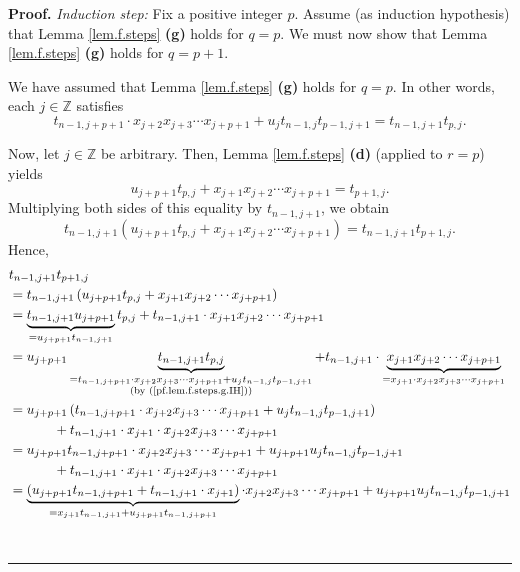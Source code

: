 \documentclass[numbers=enddot,12pt,final,onecolumn,notitlepage]{scrartcl}%
\theoremstyle{definition}
\newenvironment{proof}[1][Proof]{\noindent\textbf{#1.} }{\ \rule{0.5em}{0.5em}}
\newenvironment{vershort}{}{}
\begin{document}
\begin{proof}
\textit{Induction step:} Fix a positive integer $p$. Assume (as induction
hypothesis) that Lemma \ref{lem.f.steps} \textbf{(g)} holds for $q=p$. We must
now show that Lemma \ref{lem.f.steps} \textbf{(g)} holds for $q=p+1$.

We have assumed that Lemma \ref{lem.f.steps} \textbf{(g)} holds for $q=p$. In
other words, each $j\in\mathbb{Z}$ satisfies%
\begin{equation}
t_{n-1,j+p+1}\cdot x_{j+2}x_{j+3}\cdots x_{j+p+1}+u_{j}t_{n-1,j}%
t_{p-1,j+1}=t_{n-1,j+1}t_{p,j}. \label{pf.lem.f.steps.g.IH}%
\end{equation}


\begin{vershort}
Now, let $j\in\mathbb{Z}$ be arbitrary. Then, Lemma \ref{lem.f.steps}
\textbf{(d)} (applied to $r=p$) yields%
\[
u_{j+p+1}t_{p,j}+x_{j+1}x_{j+2}\cdots x_{j+p+1}=t_{p+1,j}.
\]
Multiplying both sides of this equality by $t_{n-1,j+1}$, we obtain%
\[
t_{n-1,j+1}\left(  u_{j+p+1}t_{p,j}+x_{j+1}x_{j+2}\cdots x_{j+p+1}\right)
=t_{n-1,j+1}t_{p+1,j}.
\]
Hence,%
\begin{align*}
&  t_{n-1,j+1}t_{p+1,j}\\
&  =t_{n-1,j+1}\left(  u_{j+p+1}t_{p,j}+x_{j+1}x_{j+2}\cdots x_{j+p+1}\right)
\\
&  =\underbrace{t_{n-1,j+1}u_{j+p+1}}_{=u_{j+p+1}t_{n-1,j+1}}t_{p,j}%
+t_{n-1,j+1}\cdot x_{j+1}x_{j+2}\cdots x_{j+p+1}\\
&  =u_{j+p+1}\underbrace{t_{n-1,j+1}t_{p,j}}_{\substack{=t_{n-1,j+p+1}\cdot
x_{j+2}x_{j+3}\cdots x_{j+p+1}+u_{j}t_{n-1,j}t_{p-1,j+1}\\\text{(by
(\ref{pf.lem.f.steps.g.IH}))}}}+t_{n-1,j+1}\cdot\underbrace{x_{j+1}%
x_{j+2}\cdots x_{j+p+1}}_{=x_{j+1}\cdot x_{j+2}x_{j+3}\cdots x_{j+p+1}}\\
&  =u_{j+p+1}\left(  t_{n-1,j+p+1}\cdot x_{j+2}x_{j+3}\cdots x_{j+p+1}%
+u_{j}t_{n-1,j}t_{p-1,j+1}\right) \\
&  \ \ \ \ \ \ \ \ \ \ +t_{n-1,j+1}\cdot x_{j+1}\cdot x_{j+2}x_{j+3}\cdots
x_{j+p+1}\\
&  =u_{j+p+1}t_{n-1,j+p+1}\cdot x_{j+2}x_{j+3}\cdots x_{j+p+1}+u_{j+p+1}%
u_{j}t_{n-1,j}t_{p-1,j+1}\\
&  \ \ \ \ \ \ \ \ \ \ +t_{n-1,j+1}\cdot x_{j+1}\cdot x_{j+2}x_{j+3}\cdots
x_{j+p+1}\\
&  =\underbrace{\left(  u_{j+p+1}t_{n-1,j+p+1}+t_{n-1,j+1}\cdot x_{j+1}%
\right)  }_{\substack{=x_{j+1}t_{n-1,j+1}+u_{j+p+1}t_{n-1,j+p+1}}}\cdot
x_{j+2}x_{j+3}\cdots x_{j+p+1}+u_{j+p+1}u_{j}t_{n-1,j}t_{p-1,j+1}\\

\end{align*}
\end{vershort}
\end{proof}
\end{document}
